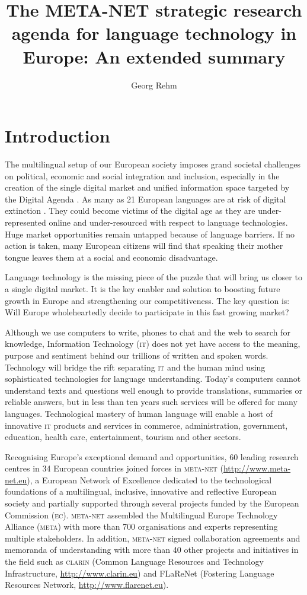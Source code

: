 \documentclass[output=paper]{LSP/langsci}
\title{The META-NET strategic research agenda for language technology   in Europe: {A}n extended summary}
\author{Georg Rehm \affiliation{DFKI GmbH}}
\begin{document}
  
\section{Introduction}
\label{sec:introduction}

The multilingual setup of our European society imposes grand societal
challenges on political, economic and social integration and
inclusion, especially in the creation of the single digital market and
unified information space targeted by the Digital Agenda
\citep{DA2010}. As many as 21 European languages are at risk of
digital extinction \citep{LWP2012}. They could become victims of the
digital age as they are under-represented online and under-resourced
with respect to language technologies. Huge market opportunities
remain untapped because of language barriers. If no action is taken,
many European citizens will find that speaking their mother tongue
leaves them at a social and economic disadvantage.

Language technology is the missing piece of the puzzle that will bring
us closer to a single digital market. It is the key enabler and
solution to boosting future growth in Europe and strengthening our
competitiveness. The key question is: Will Europe wholeheartedly
decide to participate in this fast growing market?

Although we use computers to write, phones to chat and the web to
search for knowledge, Information Technology (\textsc{it}) does not yet have access to the meaning,
purpose and sentiment behind our trillions of written and spoken
words. Technology will bridge the rift separating \textsc{it} and the human
mind using sophisticated technologies for language
understanding. Today's computers cannot understand texts and questions
well enough to provide translations, summaries or reliable answers,
but in less than ten years such services will be offered for many
languages. Technological mastery of human language will enable a host
of innovative \textsc{it} products and services in commerce, administration,
government, education, health care, entertainment, tourism and other
sectors.

Recognising Europe's exceptional demand and opportunities, 60 leading
research centres in 34 European countries joined forces in \textsc{meta-net}
(\url{http://www.meta-net.eu}), a European Network of Excellence
dedicated to the technological foundations of a multilingual,
inclusive, innovative and reflective European society and partially
supported through several projects funded by the European Commission
(\textsc{ec}). \textsc{meta-net} assembled the Multilingual Europe Technology Alliance
(\textsc{meta}) with more than 700 organisations and experts representing
multiple stakeholders. In addition, \textsc{meta-net} signed collaboration
agreements and memoranda of understanding
\citep[see][]{metanetcolab2013} with more than 40 other projects and
initiatives in the field such as \textsc{clarin} (Common Language Resources and
Technology Infrastructure, \url{http://www.clarin.eu}) and FLaReNet
(Fostering Language Resources Network, \url{http://www.flarenet.eu}).
\end{document}
